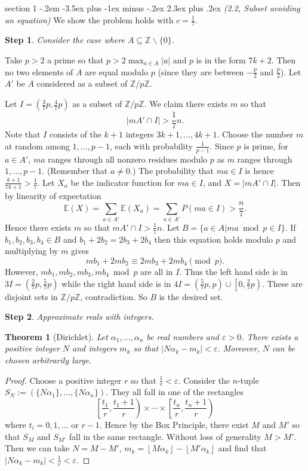 \documentclass[12pt]{article}
\makeatletter
\theoremstyle{norm}
\newtheorem{thm}{Theorem}[section]
\newtheorem{st}{Step}
\newcommand{\E}[0]{\mathbb{E}}
\newcommand{\Z}[0]{\mathbb{Z}}
\newcommand{\rc}[1]{\frac{1}{#1}}
\newcommand{\subeq}[0]{\subseteq}
\newcommand{\al}[0]{\alpha}
\newcommand{\ep}[0]{\varepsilon}
\newcommand{\pa}[1]{\left( {#1} \right)}
\newcommand{\fl}[1]{\left\lfloor {#1}\right\rfloor}
\newcommand{\bs}[0]{\backslash}
\newenvironment{problem}{\@startsection
       {section}
       {1}
       {-.2em}
       {-3.5ex plus -1ex minus -.2ex}
       {2.3ex plus .2ex}
       {\pagebreak[3]%
       \large\bf\noindent{Problem }
       }
       }
       {%
       }
\makeatother
\begin{document}
\begin{problem}{\it (2.2, Subset avoiding an equation)}
We show the problem holds with $c=\rc{7}$.
\begin{st}
Consider the case where $A\subeq \Z\bs\{0\}$.
\end{st}
Take $p>2$ a prime so that $p>2\max_{a\in A}|a|$ and $p$ is in the form $7k+2$. Then no two elements of $A$ are equal modulo $p$ (since they are between $-\frac{p}{2}$ and $\frac{p}{2}$). Let $A'$ be $A$ considered as a subset of $\Z/p\Z$.

Let $I=\pa{\frac 37p,\frac 47p}$ as a subset of $\Z/p\Z$. 
We claim there exists $m$ so that
\[
|mA'\cap I|>\frac{1}{7}n.
\]
Note that $I$ consists of the $k+1$ integers $3k+1,\ldots, 4k+1$. Choose the number $m$ at random among $1,\ldots, p-1$, each with probability $\rc{p-1}$. Since $p$ is prime, for $a\in A'$, $ma$ ranges through all nonzero residues modulo $p$ as $m$ ranges through $1,\ldots, p-1$. (Remember that $a\neq 0$.)
The probability that $ma\in I$ is hence $\frac{k+1}{7k+1}>\rc{7}$. Let $X_a$ be the indicator function for $ma\in I$, and $X=|mA'\cap I|$. Then by linearity of expectation
\[
\E(X)=\sum_{a\in A'} \E(X_a)=\sum_{a\in A'}P(ma\in I)>\frac{n}{7}.
\] 
Hence there exists $m$ so that $mA'\cap I>\frac{1}{7}n$. Let $B=\{a\in A|ma\bmod{p}\in I\}$. If $b_1,b_2,b_3,b_4\in B$ and $b_1+2b_2=2b_3+2b_4$ then this equation holds modulo $p$ and multiplying by $m$ gives
\[
mb_1+2mb_2\equiv 2mb_3+2mb_4\pmod{p}.
\]
However, $mb_1,mb_2,mb_3,mb_4\bmod{p}$ are all in $I$. Thus the left hand side is in $3I=\pa{\frac{2}{7}p,\frac 57p}$ while the right hand side is in $4I=\pa{\frac 57 p,p}\cup\left[0,\frac 27p\right)$. These are disjoint sets in $\Z/p\Z$, contradiction. So $B$ is the desired set.\\

\begin{st}
Approximate reals with integers.
\end{st}
\begin{thm}[Dirichlet]
Let $\al_1,\ldots, \al_n$ be real numbers and $\ep>0$. There exists a positive integer $N$ and integers $m_k$ so that $|N\al_k-m_k|<\ep$. Moreover, $N$ can be chosen arbitrarily large.
\end{thm}
\begin{proof}
Choose a positive integer $r$ so that $\rc{r}<\ep$. 
Consider the $n$-tuple $S_N:=(\{N\al_1\},\ldots, \{N\al_n\})$. They all fall in one of the rectangles
\[
\left[
\frac{t_1}{r},\frac{t_1+1}{r}
\right)\times \cdots
\times
\left[
\frac{t_n}{r},\frac{t_n+1}{r}\right)
\]
where $t_i=0,1,\ldots$ or $r-1$. Hence by the Box Principle, there exist $M$ and $M'$ so that $S_M$ and $S_{M'}$ fall in the same rectangle. Without loss of generality $M>M'$. Then we can take $N=M-M'$, $m_k=\fl{M\al_k}-\fl{M'\al_k}$ and find that $|N\al_k-m_k|<\rc{r}<\ep$. 


\end{proof}
\end{problem}
\end{document}
